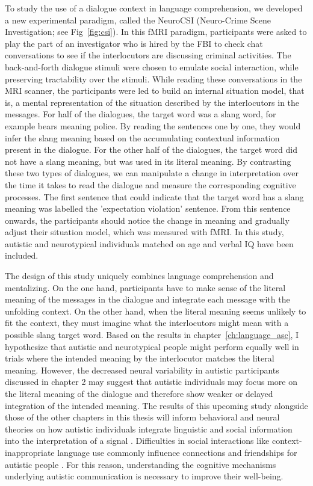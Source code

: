 To study the use of a dialogue context in language comprehension, we developed a new experimental paradigm, called the NeuroCSI (Neuro-Crime Scene Investigation; see Fig~\ref{fig:csi}). In this fMRI paradigm, participants were asked to play the part of an investigator who is hired by the FBI to check chat conversations to see if the interlocutors are discussing criminal activities. The back-and-forth dialogue stimuli were chosen to emulate social interaction, while preserving tractability over the stimuli. While reading these conversations in the MRI scanner, the participants were led to build an internal situation model, that is, a mental representation of the situation described by the interlocutors in the messages. For half of the dialogues, the target word was a slang word, for example bears meaning police. By reading the sentences one by one, they would infer the slang meaning based on the accumulating contextual information present in the dialogue. For the other half of the dialogues, the target word did not have a slang meaning, but was used in its literal meaning. By contrasting these two types of dialogues, we can manipulate a change in interpretation over the time it takes to read the dialogue and measure the corresponding cognitive processes. The first sentence that could indicate that the target word has a slang meaning was labelled the 'expectation violation' sentence. From this sentence onwards, the participants should notice the change in meaning and gradually adjust their situation model, which was measured with fMRI. In this study, autistic and neurotypical individuals matched on age and verbal IQ have been included. 


The design of this study uniquely combines language comprehension and mentalizing. On the one hand, participants have to make sense of the literal meaning of the messages in the dialogue and integrate each message with the unfolding context. On the other hand, when the literal meaning seems unlikely to fit the context, they must imagine what the interlocutors might mean with a possible slang target word. Based on the results in chapter~\ref{ch:language_asc}, I hypothesize that autistic and neurotypical people might perform equally well in trials where the intended meaning by the interlocutor matches the literal meaning. However, the decreased neural variability in autistic participants discussed in chapter 2 may suggest that autistic individuals may focus more on the literal meaning of the dialogue and therefore show weaker or delayed integration of the intended meaning. The results of this upcoming study alongside those of the other chapters in this thesis will inform behavioral and neural theories on how autistic individuals integrate linguistic and social information into the interpretation of a signal \citep{wadge2019}. Difficulties in social interactions like context-inappropriate language use commonly influence connections and friendships for autistic people \citep{howlin2004,bauminger2003,bauminger2000}. For this reason, understanding the cognitive mechanisms underlying autistic communication is necessary to improve their well-being.

